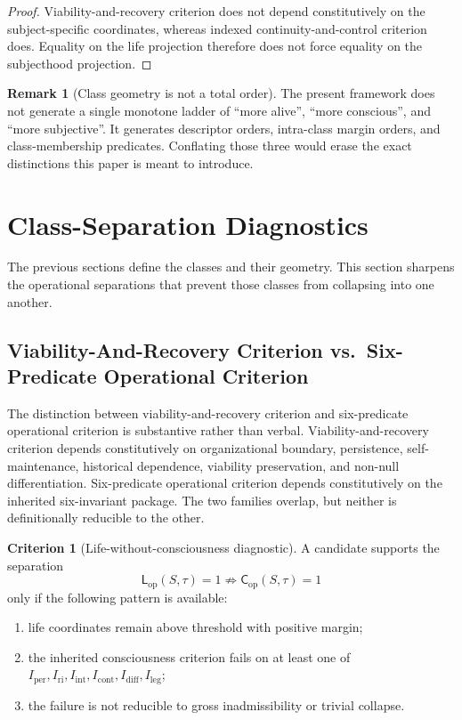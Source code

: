 \documentclass[11pt,a4paper]{article}
\theoremstyle{definition}
\newtheorem{remark}[proposition]{Remark}
\newtheorem{criterion}[proposition]{Criterion}
\newcommand{\Cop}{\mathsf{C}_{\mathrm{op}}}
\newcommand{\Lop}{\mathsf{L}_{\mathrm{op}}}
\newcommand{\Iper}{I_{\mathrm{per}}}
\newcommand{\Iri}{I_{\mathrm{ri}}}
\newcommand{\Iint}{I_{\mathrm{int}}}
\newcommand{\Icont}{I_{\mathrm{cont}}}
\newcommand{\Idiff}{I_{\mathrm{diff}}}
\newcommand{\Ileg}{I_{\mathrm{leg}}}
\begin{document}
\begin{proof}
Viability-and-recovery criterion does not depend constitutively on the subject-specific coordinates, whereas indexed continuity-and-control criterion does. Equality on the life projection therefore does not force equality on the subjecthood projection.
\end{proof}

\begin{remark}[Class geometry is not a total order]
The present framework does not generate a single monotone ladder of ``more alive'', ``more conscious'', and ``more subjective''. It generates descriptor orders, intra-class margin orders, and class-membership predicates. Conflating those three would erase the exact distinctions this paper is meant to introduce.
\end{remark}

\section{Class-Separation Diagnostics}
The previous sections define the classes and their geometry. This section sharpens the operational separations that prevent those classes from collapsing into one another.

\subsection{Viability-And-Recovery Criterion vs.\ Six-Predicate Operational Criterion}
The distinction between viability-and-recovery criterion and six-predicate operational criterion is substantive rather than verbal. Viability-and-recovery criterion depends constitutively on organizational boundary, persistence, self-maintenance, historical dependence, viability preservation, and non-null differentiation. Six-predicate operational criterion depends constitutively on the inherited six-invariant package. The two families overlap, but neither is definitionally reducible to the other.

\begin{criterion}[Life-without-consciousness diagnostic]
A candidate supports the separation
\[
\Lop(S,\tau)=1 \not\Rightarrow \Cop(S,\tau)=1
\]
only if the following pattern is available:
\begin{enumerate}[leftmargin=1.5em]
\item life coordinates remain above threshold with positive margin;
\item the inherited consciousness criterion fails on at least one of $\Iper,\Iri,\Iint,\Icont,\Idiff,\Ileg$;
\item the failure is not reducible to gross inadmissibility or trivial collapse.
\end{enumerate}
\end{criterion}
\end{document}
